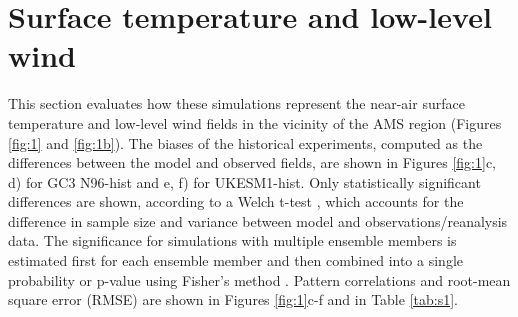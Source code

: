 




 

%


\section{Surface temperature and low-level wind} \label{sq:clim}



This section evaluates how these simulations represent the near-air surface temperature and low-level wind fields in the vicinity of the AMS region (Figures \ref{fig:1} and \ref{fig:1b}). %
The biases of the historical experiments, computed as the differences between the model and observed fields, are shown in Figures \ref{fig:1}c, d) for GC3 N96-hist and e, f) for UKESM1-hist.
 Only statistically significant differences are shown, according to a Welch t-test \citep{wilks2011}, which accounts for the difference in sample size and variance between model and observations/reanalysis data. The significance for simulations with multiple ensemble members is estimated first for each ensemble member and then combined into a single probability or p-value using Fisher's method \citep{fisher1992statistical}. Pattern correlations and root-mean square error (RMSE) are shown in Figures \ref{fig:1}c-f and in Table \ref{tab:s1}.
 
